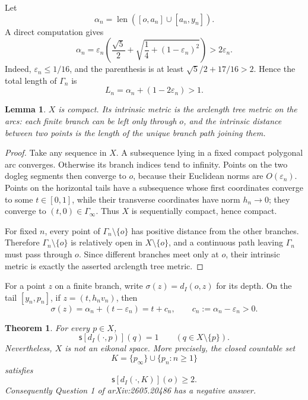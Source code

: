 \documentclass[11pt]{article}
\newtheorem{theorem}{Theorem}
\newtheorem{lemma}{Lemma}
\newcommand{\slope}{\mathsf{s}}
\begin{document}
Let
\[
  \alpha_n=\operatorname{len}([o,a_n]\cup[a_n,y_n]).
\]
A direct computation gives
\begin{equation}\label{eq:alpha}
 \alpha_n=\varepsilon_n\left(
  \frac{\sqrt5}{2}+
  \sqrt{\frac14+(1-\varepsilon_n)^2}\right)>2\varepsilon_n.
\end{equation}
Indeed, $\varepsilon_n\leq1/16$, and the parenthesis is at least
$\sqrt5/2+17/16>2$. Hence the total length of $\Gamma_n$ is
\begin{equation}\label{eq:Ln}
  L_n=\alpha_n+(1-2\varepsilon_n)>1.
\end{equation}

\begin{lemma}\label{lem:tree}
$X$ is compact. Its intrinsic metric is the arclength tree metric on the arcs:
each finite branch can be left only through $o$, and the intrinsic distance
between two points is the length of the unique branch path joining them.
\end{lemma}

\begin{proof}
Take any sequence in $X$. A subsequence lying in a fixed compact polygonal
arc converges. Otherwise its branch indices tend to infinity. Points on the
two dogleg segments then converge to $o$, because their Euclidean norms are
$O(\varepsilon_n)$. Points on the horizontal tails have a subsequence whose
first coordinates converge to some $t\in[0,1]$, while their transverse
coordinates have norm $h_n\to0$; they converge to $(t,0)\in\Gamma_\infty$.
Thus $X$ is sequentially compact, hence compact.

For fixed $n$, every point of $\Gamma_n\setminus\{o\}$ has positive distance
from the other branches. Therefore $\Gamma_n\setminus\{o\}$ is relatively
open in $X\setminus\{o\}$, and a continuous path leaving $\Gamma_n$ must pass
through $o$. Since different branches meet only at $o$, their intrinsic
metric is exactly the asserted arclength tree metric.
\end{proof}

For a point $z$ on a finite branch, write $\sigma(z)=d_I(o,z)$ for its depth.
On the tail $[y_n,p_n]$, if $z=(t,h_n v_n)$, then
\begin{equation}\label{eq:depth-tail}
  \sigma(z)=\alpha_n+(t-\varepsilon_n)=t+c_n,
  \qquad c_n:=\alpha_n-\varepsilon_n>0.
\end{equation}

\begin{theorem}\label{thm:counterexample}
For every $p\in X$,
\[
  \slope[d_I(\cdot,p)](q)=1\qquad(q\in X\setminus\{p\}).
\]
Nevertheless, $X$ is not an eikonal space. More precisely, the closed
countable set
\[
  K=\{p_\infty\}\cup\{p_n:n\geq1\}
\]
satisfies
\[
  \slope[d_I(\cdot,K)](o)\geq2.
\]
Consequently Question 1 of arXiv:2605.20486 has a negative answer.
\end{theorem}
\end{document}
